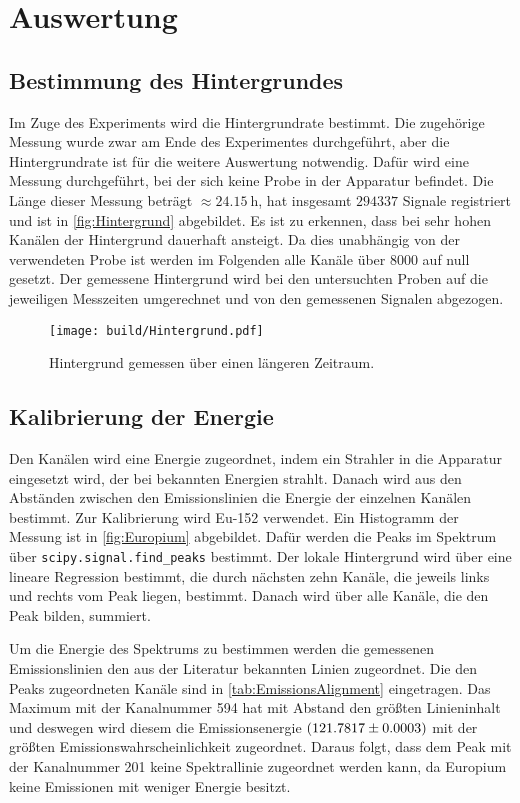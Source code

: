 \section{Auswertung}
\label{sec:auswertung}

\subsection{Bestimmung des Hintergrundes}

Im Zuge des Experiments wird die Hintergrundrate bestimmt. Die zugehörige Messung wurde zwar am Ende des Experimentes durchgeführt, aber die Hintergrundrate ist für die weitere Auswertung notwendig.  
Dafür wird eine Messung durchgeführt, bei der sich keine Probe in der Apparatur befindet.
Die Länge dieser Messung beträgt $\approx \SI{24.15}{\hour}$, hat insgesamt $294337$ Signale registriert und ist in \autoref{fig:Hintergrund} abgebildet. 
Es ist zu erkennen, dass bei sehr hohen Kanälen der Hintergrund dauerhaft ansteigt. Da dies unabhängig von der verwendeten Probe ist werden im Folgenden alle Kanäle über $8000$ auf null gesetzt.
Der gemessene Hintergrund wird bei den untersuchten Proben auf die jeweiligen Messzeiten umgerechnet und von den gemessenen Signalen abgezogen.  

\begin{figure}[H]
    \centering
    \texttt{[image: build/Hintergrund.pdf]}
    \caption{Hintergrund gemessen über einen längeren Zeitraum.}
    \label{fig:Hintergrund}
\end{figure}


\subsection{Kalibrierung der Energie}

Den Kanälen wird eine Energie zugeordnet, indem ein Strahler in die Apparatur eingesetzt wird, der bei bekannten Energien strahlt. 
Danach wird aus den Abständen zwischen den Emissionslinien die Energie der einzelnen Kanälen bestimmt.  
Zur Kalibrierung wird Eu-152 verwendet.
Ein Histogramm der Messung ist in \autoref{fig:Europium} abgebildet.
Dafür werden die Peaks im Spektrum über \texttt{scipy.signal.find\_peaks} \cite{scipy} bestimmt.
Der lokale Hintergrund wird über eine lineare Regression bestimmt, die durch nächsten zehn Kanäle, die jeweils links und rechts vom Peak liegen, bestimmt.
Danach wird über alle Kanäle, die den Peak bilden, summiert.

Um die Energie des Spektrums zu bestimmen werden die gemessenen Emissionslinien den aus der Literatur \cite{LNHB} bekannten Linien zugeordnet.
Die den Peaks zugeordneten Kanäle sind in \autoref{tab:EmissionsAlignment} eingetragen.
Das Maximum mit der Kanalnummer 594 hat mit Abstand den größten Linieninhalt und deswegen wird diesem die Emissionsenergie $\SI{121.7817 \pm 0.0003}{}$ mit der größten Emissionswahrscheinlichkeit zugeordnet.
Daraus folgt, dass dem Peak mit der Kanalnummer 201 keine Spektrallinie zugeordnet werden kann, da Europium keine Emissionen mit weniger Energie besitzt.

